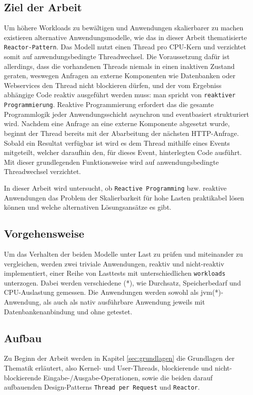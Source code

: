 \subsection{Ziel der Arbeit}
\label{subsec:ziel}
Um höhere Workloads zu bewältigen und Anwendungen skalierbarer zu machen existieren alternative
Anwendungsmodelle, wie das in dieser Arbeit thematisierte \verb|Reactor-Pattern|.
Das Modell nutzt einen Thread pro CPU-Kern und verzichtet somit auf anwendungsbedingte Threadwechsel.
Die Voraussetzung dafür ist allerdings, dass die vorhandenen Threads niemals in einen inaktiven Zustand geraten,
weswegen Anfragen an externe Komponenten wie Datenbanken oder Webservices den Thread nicht blockieren dürfen, und der vom Ergebniss abhängige
Code reaktiv ausgeführt werden muss: man spricht von \verb|reaktiver Programmierung|. Reaktive Programmierung erfordert das die gesamte Programmlogik jeder
Anwendungsschicht asynchron und eventbasiert strukturiert wird.
Nachdem eine Anfrage an eine externe Komponente abgesetzt wurde, beginnt der Thread bereits mit der Abarbeitung der nächsten
HTTP-Anfrage. Sobald ein Resultat verfügbar ist wird es dem Thread mithilfe eines Events mitgeteilt, welcher daraufhin
den, für dieses Event, hinterlegten Code ausführt. Mit dieser grundlegenden Funktionsweise wird auf anwendungsbedingte
Threadwechsel verzichtet.

In dieser Arbeit wird untersucht, ob \verb|Reactive Programming| bzw. reaktive Anwendungen das Problem der Skalierbarkeit
für hohe Lasten praktikabel lösen können und welche alternativen Lösungsansätze es gibt.

\subsection{Vorgehensweise}
\label{subsec:vorgehensweise}
Um das Verhalten der beiden Modelle unter Last zu prüfen und miteinander zu vergleichen, werden zwei triviale Anwendungen,
reaktiv und nicht-reaktiv implementiert, einer Reihe von Lasttests mit unterschiedlichen \verb|workloads| unterzogen.
Dabei werden verschiedene (*), wie Durchsatz, Speicherbedarf und CPU-Auslastung gemessen.
Die Anwendungen werden sowohl als \acrshort{jvm}(*)-Anwendung, als auch als nativ ausführbare Anwendung jeweils mit Datenbankenanbindung und
ohne getestet.

\subsection{Aufbau}
\label{subsec:aufbau}
Zu Beginn der Arbeit werden in Kapitel \ref{sec:grundlagen} die Grundlagen der Thematik erläutert, also Kernel- und User-Threads,
blockierende und nicht-blockierende Eingabe-/Ausgabe-Operationen, sowie die beiden darauf aufbauenden Design-Patterns
\verb|Thread per Request| und \verb|Reactor|.

